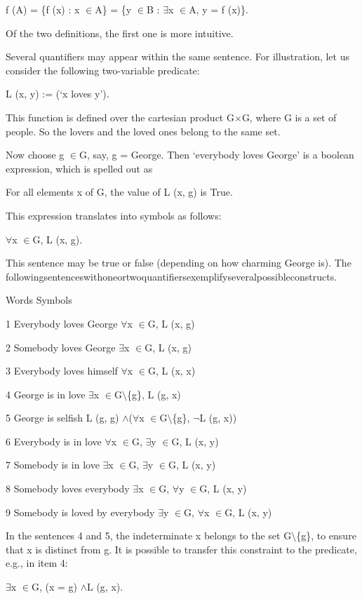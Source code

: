 \documentclass[11pt]{article}
\theoremstyle{plain}
\theoremstyle{definition}
\begin{document}
f (A) = \{f (x) : x $\in$A\} = \{y $\in$B : $\exists$x $\in$A, y = f (x)\}.

Of the two definitions, the first one is more intuitive.

Several quantifiers may appear within the same sentence. For illustration, let us consider the following two-variable predicate:

L (x, y) := (`x loves y').

This function is defined over the cartesian product G$\times$G, where G is a set of people. So the lovers and the loved ones belong to the same set.

Now choose g $\in$G, say, g = George. Then `everybody loves George' is a boolean expression, which is spelled out as

For all elements x of G, the value of L (x, g) is True.

This expression translates into symbols as follows:

$\forall$x $\in$G, L (x, g).

This sentence may be true or false (depending on how charming George is). The followingsentenceswithoneortwoquantifiersexemplifyseveralpossibleconstructs.

Words Symbols

1 Everybody loves George $\forall$x $\in$G, L (x, g)

2 Somebody loves George $\exists$x $\in$G, L (x, g)

3 Everybody loves himself $\forall$x $\in$G, L (x, x)

4 George is in love $\exists$x $\in$G$\setminus$\{g\}, L (g, x)

5 George is selfish L (g, g) $\land$($\forall$x $\in$G$\setminus$\{g\}, $\neg$L (g, x))

6 Everybody is in love $\forall$x $\in$G, $\exists$y $\in$G, L (x, y)

7 Somebody is in love $\exists$x $\in$G, $\exists$y $\in$G, L (x, y)

8 Somebody loves everybody $\exists$x $\in$G, $\forall$y $\in$G, L (x, y)

9 Somebody is loved by everybody $\exists$y $\in$G, $\forall$x $\in$G, L (x, y)

In the sentences 4 and 5, the indeterminate x belongs to the set G$\setminus$\{g\}, to ensure that x is distinct from g. It is possible to transfer this constraint to the predicate, e.g., in item 4:

$\exists$x $\in$G, (x = g) $\land$L (g, x).
\end{document}
